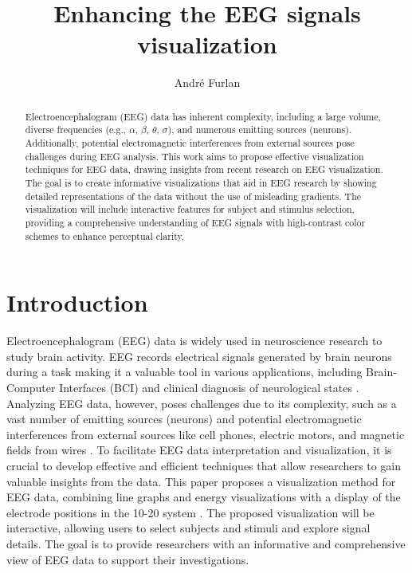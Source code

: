\documentclass[format=sigconf]{acmart}
\title{Enhancing the EEG signals visualization}
\author{André Furlan}
\affiliation{
	\institution{UNESP - Universidade Estadual Paulista Júlio de Mesquita Filho}
	\city{São José do Rio Preto}
	\state{André Furlan}
	\country{Brazil}
}
\begin{document}
	
	\begin{abstract}
		Electroencephalogram (EEG) data has inherent complexity, including a large volume, diverse frequencies (e.g., $\alpha$, $\beta$, $\theta$, $\sigma$), and numerous emitting sources (neurons). Additionally, potential electromagnetic interferences from external sources pose challenges during EEG analysis. This work aims to propose effective visualization techniques for EEG data, drawing insights from recent research on EEG visualization. The goal is to create informative visualizations that aid in EEG research by showing detailed representations of the data without the use of misleading gradients. The visualization will include interactive features for subject and stimulus selection, providing a comprehensive understanding of EEG signals with high-contrast color schemes to enhance perceptual clarity.
	\end{abstract}
	
	\maketitle
	
	\section{Introduction}
		\par Electroencephalogram (EEG) data is widely used in neuroscience research to study brain activity. EEG records electrical signals generated by brain neurons during a task making it a valuable tool in various applications, including Brain-Computer Interfaces (BCI) and clinical diagnosis of neurological states \cite{8937083}. Analyzing EEG data, however, poses challenges due to its complexity, such as a vast number of emitting sources (neurons) and potential electromagnetic interferences from external sources like cell phones, electric motors, and magnetic fields from wires \cite{8937083}. To facilitate EEG data interpretation and visualization, it is crucial to develop effective and efficient techniques that allow researchers to gain valuable insights from the data. This paper proposes a visualization method for EEG data, combining line graphs and energy visualizations with a display of the electrode positions in the 10-20 system \cite{sistema10-20}. The proposed visualization will be interactive, allowing users to select subjects and stimuli and explore signal details. The goal is to provide researchers with an informative and comprehensive view of EEG data to support their investigations.
	
\end{document}
